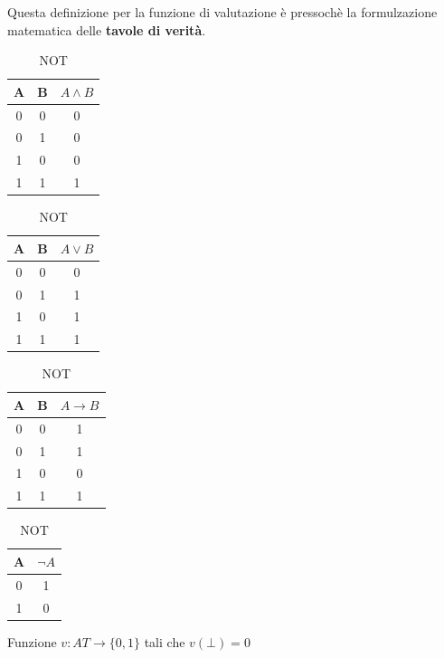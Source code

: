 \documentclass[a4paper, 12pt]{book}
\newcommand{\definizione}[2]{%
\vspace{15pt}%
\begin{tcolorbox}[
  colback=cyan!5!white,
  colframe=blue!50!black,
  title=\textbf{Definizione: #1}, %
  coltitle=white,
  fonttitle=\bfseries,
  arc=3mm,
  boxrule=0.5pt,
  enhanced,
  breakable
]
#2 %
\end{tcolorbox}
\vspace{15pt}%
}
\begin{document}
  Questa definizione per la funzione di valutazione è pressochè la formulzazione matematica delle \textbf{tavole di verità}.

  \begin{table}[h]
  \centering
  \begin{minipage}{0.23\textwidth}
  \centering
  \begin{tabular}{c|c|c}
  A & B & $A \land B$ \\ \hline
  0 & 0 & 0 \\
  0 & 1 & 0 \\
  1 & 0 & 0 \\
  1 & 1 & 1
  \end{tabular}
  \caption*{AND}
  \end{minipage}\hfill
  \begin{minipage}{0.23\textwidth}
  \centering
  \begin{tabular}{c|c|c}
  A & B & $A \lor B$ \\ \hline
  0 & 0 & 0 \\
  0 & 1 & 1 \\
  1 & 0 & 1 \\
  1 & 1 & 1
  \end{tabular}
  \caption*{OR}
  \end{minipage}\hfill
  \begin{minipage}{0.23\textwidth}
  \centering
  \begin{tabular}{c|c|c}
  A & B & $A \rightarrow B$ \\ \hline
  0 & 0 & 1 \\
  0 & 1 & 1 \\
  1 & 0 & 0 \\
  1 & 1 & 1
  \end{tabular}
  \caption*{IMPLICAZIONE}
  \end{minipage}\hfill
  \begin{minipage}{0.23\textwidth}
  \centering
  \begin{tabular}{c|c}
  A & $\neg A$ \\ \hline
  0 & 1 \\
  1 & 0
  \end{tabular}
  \caption*{NOT}
  \end{minipage}

  \end{table}


  \definizione{valutazione atomica}{Funzione $v: AT \rightarrow \{0, 1\}$ tali che $v(\bot) = 0$ 
  }
\end{document}
